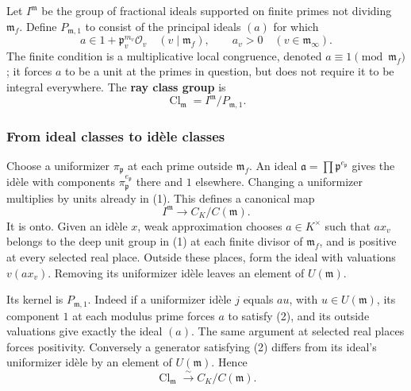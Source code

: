 \documentclass[11pt,a4paper]{article}
\begin{document}
Let \(I^{\mathfrak m}\) be the group of fractional ideals supported on
finite primes not dividing \(\mathfrak m_f\). Define
\(P_{\mathfrak m,1}\) to consist of the principal ideals \((a)\) for
which \[
a\in1+\mathfrak p_v^{m_v}\mathcal O_v\quad(v\mid\mathfrak m_f),
\qquad a_v>0\quad(v\in\mathfrak m_\infty).
\tag{2}
\] The finite condition is a multiplicative local congruence, denoted
\(a\equiv1\pmod{\mathfrak m_f}\); it forces \(a\) to be a unit at the
primes in question, but does not require it to be integral everywhere.
The \textbf{ray class group} is \[
\operatorname{Cl}_{\mathfrak m}=I^{\mathfrak m}/P_{\mathfrak m,1}.
\tag{3}
\]

\subsubsection{From ideal classes to idèle
classes}\label{from-ideal-classes-to-iduxe8le-classes}

Choose a uniformizer \(\pi_{\mathfrak p}\) at each prime outside
\(\mathfrak m_f\). An ideal
\(\mathfrak a=\prod\mathfrak p^{e_{\mathfrak p}}\) gives the idèle with
components \(\pi_{\mathfrak p}^{e_{\mathfrak p}}\) there and \(1\)
elsewhere. Changing a uniformizer multiplies by units already in (1).
This defines a canonical map \[
I^{\mathfrak m}\longrightarrow C_K/C(\mathfrak m).
\] It is onto. Given an idèle \(x\), weak approximation chooses
\(a\in K^\times\) such that \(ax_v\) belongs to the deep unit group in
(1) at each finite divisor of \(\mathfrak m_f\), and is positive at
every selected real place. Outside these places, form the ideal with
valuations \(v(ax_v)\). Removing its uniformizer idèle leaves an element
of \(U(\mathfrak m)\).

Its kernel is \(P_{\mathfrak m,1}\). Indeed if a uniformizer idèle \(j\)
equals \(a u\), with \(u\in U(\mathfrak m)\), its component \(1\) at
each modulus prime forces \(a\) to satisfy (2), and its outside
valuations give exactly the ideal \((a)\). The same argument at selected
real places forces positivity. Conversely a generator satisfying (2)
differs from its ideal's uniformizer idèle by an element of
\(U(\mathfrak m)\). Hence \[
\operatorname{Cl}_{\mathfrak m}\xrightarrow{\sim}C_K/C(\mathfrak m).
\tag{4}
\]
\end{document}
